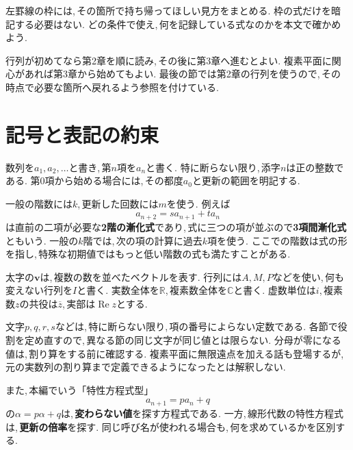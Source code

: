 \begin{bookcolumns}
左罫線の枠には,\,その箇所で持ち帰ってほしい見方をまとめる.
枠の式だけを暗記する必要はない.
どの条件で使え,\,何を記録している式なのかを本文で確かめよう.

行列が初めてなら第2章を順に読み,\,その後に第3章へ進むとよい.
複素平面に関心があれば第3章から始めてもよい.
最後の節では第2章の行列を使うので,\,その時点で必要な箇所へ戻れるよう参照を付けている.

\section{記号と表記の約束}\label{節：記号と表記}

数列を$a_1,a_2,\ldots$と書き,\,第$n$項を$a_n$と書く.
特に断らない限り,\,添字$n$は正の整数である.
第0項から始める場合には,\,その都度$a_0$と更新の範囲を明記する.

一般の階数には$k$,\,更新した回数には$m$を使う.
例えば
\[
  a_{n+2}=s a_{n+1}+t a_n
\]
は直前の二項が必要な\textbf{2階の漸化式}であり,\,式に三つの項が並ぶので\textbf{3項間漸化式}ともいう.
一般の$k$階では,\,次の項の計算に過去$k$項を使う.
ここでの階数は式の形を指し,\,特殊な初期値ではもっと低い階数の式も満たすことがある.

太字の$\boldsymbol v$は,\,複数の数を並べたベクトルを表す.
行列には$A,M,P$などを使い,\,何も変えない行列を$I$と書く.
実数全体を$\mathbb R$,\,複素数全体を$\mathbb C$と書く.
虚数単位は$i$,\,複素数$z$の共役は$\overline z$,\,実部は$\operatorname{Re}z$とする.

文字$p,q,r,s$などは,\,特に断らない限り,\,項の番号によらない定数である.
各節で役割を定め直すので,\,異なる節の同じ文字が同じ値とは限らない.
分母が零になる値は,\,割り算をする前に確認する.
複素平面に無限遠点を加える話も登場するが,\,元の実数列の割り算まで定義できるようになったとは解釈しない.

また,\,本編でいう「特性方程式型」
\[
  a_{n+1}=pa_n+q
\]
の$\alpha=p\alpha+q$は,\,\textbf{変わらない値}を探す方程式である.
一方,\,線形代数の特性方程式は,\,\textbf{更新の倍率}を探す.
同じ呼び名が使われる場合も,\,何を求めているかを区別する.
\end{bookcolumns}
